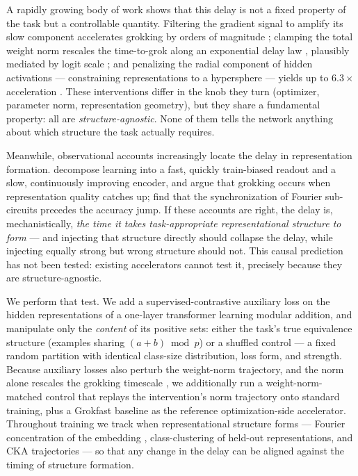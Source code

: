 \documentclass[11pt]{article}
\begin{document}
A rapidly growing body of work shows that this delay is not a fixed property of the task but a
controllable quantity. Filtering the gradient signal to amplify its slow component accelerates
grokking by orders of magnitude \citep{lee2024grokfast, neuralgrok2025}; clamping the total weight
norm rescales the time-to-grok along an exponential delay law \citep{weightnormdelay2026},
plausibly mediated by logit scale \citep{logitscale2026}; and penalizing the radial component of
hidden activations --- constraining representations to a hypersphere --- yields up to
$6.3\times$ acceleration \citep{radialsuppression2026}. These interventions differ in the knob they
turn (optimizer, parameter norm, representation geometry), but they share a fundamental property:
all are \emph{structure-agnostic}. None of them tells the network anything about which structure
the task actually requires.

Meanwhile, observational accounts increasingly locate the delay in representation formation.
\citet{twospeeds2026} decompose learning into a fast, quickly train-biased readout and a slow,
continuously improving encoder, and argue that grokking occurs when representation quality catches
up; \citet{circuitsync2026} find that the synchronization of Fourier sub-circuits precedes the
accuracy jump. If these accounts are right, the delay is, mechanistically, \emph{the time it takes
task-appropriate representational structure to form} --- and injecting that structure directly
should collapse the delay, while injecting equally strong but wrong structure should not. This
causal prediction has not been tested: existing accelerators cannot test it, precisely because
they are structure-agnostic.

We perform that test. We add a supervised-contrastive auxiliary loss \citep{khosla2020supervised}
on the hidden representations of a one-layer transformer learning modular addition, and manipulate
only the \emph{content} of its positive sets: either the task's true equivalence structure
(examples sharing $(a+b)\bmod p$) or a shuffled control --- a fixed random partition with
identical class-size distribution, loss form, and strength. Because auxiliary losses also perturb
the weight-norm trajectory, and the norm alone rescales the grokking timescale
\citep{weightnormdelay2026}, we additionally run a weight-norm-matched control that replays the
intervention's norm trajectory onto standard training, plus a Grokfast baseline
\citep{lee2024grokfast} as the reference optimization-side accelerator. Throughout training we
track when representational structure forms --- Fourier concentration of the embedding
\citep{nanda2023progress}, class-clustering of held-out representations, and CKA trajectories ---
so that any change in the delay can be aligned against the timing of structure formation.
\end{document}
